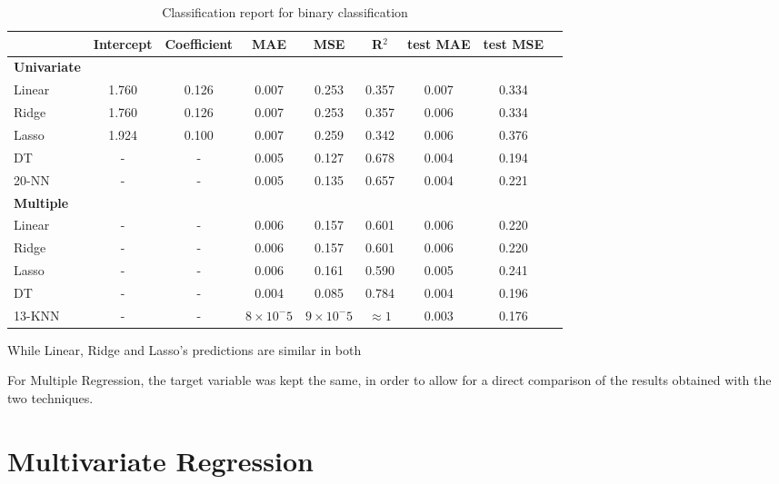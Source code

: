 \begin{table}[H]
    \centering
    \begin{tabular}{lcccccccc}
        \toprule
         & \textbf{Intercept} & \textbf{Coefficient} & \textbf{MAE} & \textbf{MSE} & \textbf{R$^2$} & \textbf{test MAE} & \textbf{test MSE} \\
        \midrule
        \textbf{Univariate} & & & & & \\
        \midrule
        Linear & 1.760 & 0.126 & 0.007 & 0.253 & 0.357 & 0.007 & 0.334 \\
        Ridge & 1.760 & 0.126 & 0.007 & 0.253 & 0.357 & 0.006 & 0.334 \\ %
        Lasso & 1.924 & 0.100 & 0.007 & 0.259 & 0.342 & 0.006 & 0.376 \\ %
        DT & - & - & 0.005 & 0.127 & 0.678 & 0.004 & 0.194 \\ %
        20-NN & - & - & 0.005 & 0.135 & 0.657 & 0.004 & 0.221 \\
        \midrule
        \textbf{Multiple} & & & & & \\
        \midrule
        Linear & - & - & 0.006 & 0.157 & 0.601 & 0.006 & 0.220 \\
        Ridge & - & - & 0.006 & 0.157 & 0.601 & 0.006 & 0.220 \\ %
        Lasso & - & - & 0.006 & 0.161 & 0.590 & 0.005 & 0.241 \\ %
        DT & - & - & 0.004 & 0.085 & 0.784 & 0.004 & 0.196 \\ %
        13-KNN & - & - & $8\times10^-5$ & $9\times10^-5$ & $\approx 1$ & 0.003 & 0.176 \\
        \bottomrule
    \end{tabular}
    \caption{Classification report for binary classification}
    \label{tab:binary_classification_report}
\end{table}
While Linear, Ridge and Lasso's predictions are similar in both 

For Multiple Regression, the target variable was kept the same, in order to
allow for a direct comparison of the results obtained with the two techniques.


\section{Multivariate Regression}
